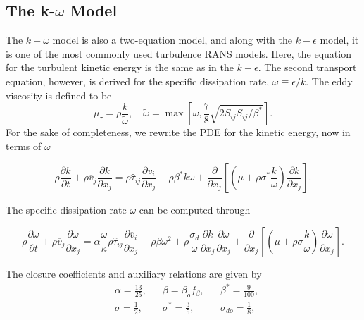 \subsection{The k-$\omega$ Model}
The $k-\omega$ model is also a two-equation model, and along with the $k-\epsilon$ model, it is one of the most commonly used turbulence RANS models. Here, the equation for the turbulent kinetic energy is the same as in the $k-\epsilon$. The second transport equation, however, is derived for the specific dissipation rate, $\omega\equiv\epsilon/k$. The eddy viscosity is defined to be
\begin{equation}
    \mu_\tau = \rho\frac{k}{\tilde \omega}, \quad \tilde\omega= \max{\left[\omega, \frac{7}{8}\sqrt{2S_{ij}S_{ij}/\beta^*}\right]}.
\end{equation}
For the sake of completeness, we rewrite the PDE for the kinetic energy, now in terms of $\omega$
\begin{eqBox}
\begin{equation}
    \rho\frac{\partial k}{\partial t} + 
    \rho\overline v_j \frac{\partial k}{\partial x_j} 
    = \rho \hat \tau_{ij} \frac{\partial \overline v_i}{\partial x_j}
    - \rho\beta^* k\omega + \frac{\partial}{\partial x_j}\left[\left(\mu + \rho \sigma^* \frac{k}{\omega}\right)\frac{\partial k}{\partial x_j}\right].
\end{equation}
\end{eqBox}
The specific dissipation rate $\omega$ can be computed through~\cite{wilcox1998turbulence}
\begin{eqBox}
\begin{equation}
    \rho \frac{\partial \omega}{\partial t} + 
    \rho \overline v_j \frac{\partial \omega}{\partial x_j} 
    = \alpha \frac{\omega}{\kappa} \rho \hat \tau_{ij} \frac{\partial \overline v_i}{\partial x_j} 
    - \rho \beta \omega^2 
    + \rho \frac{\sigma_d}{\omega} \frac{\partial k}{\partial x_j} 
    \frac{\partial \omega}{\partial x_j} 
    + \frac{\partial}{\partial x_j} \left[\left(\mu + \rho\sigma\frac{k}{\omega}\right)\frac{\partial \omega}{\partial x_j}\right].
\end{equation}
\end{eqBox}
The closure coefficients and auxiliary relations are given by
\begin{align}
& \alpha= \frac{13}{25}, & & \beta = \beta_o f_\beta, & & \beta^* = \frac{9}{100}, \\
& \sigma = \frac{1}{2}, & & \sigma^* = \frac{3}{5}, & & \sigma_{do} = \frac{1}{8},
\end{align}
